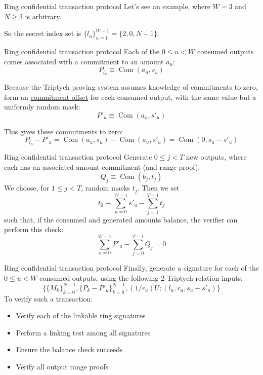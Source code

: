 \documentclass[aspectratio=169]{beamer}
\newcommand{\com}{\operatorname{Com}}
\begin{document}
\begin{frame}{Ring confidential transaction protocol}
Let's see an example, where $W = 3$ and $N \geq 3$ is arbitrary.

\begin{center}
\end{center}

So the secret index set is $\{l_u\}_{u=1}^{W-1} = \{2, 0, N-1\}$.
\end{frame}


\begin{frame}{Ring confidential transaction protocol}
Each of the $0 \leq u < W$ consumed outputs comes associated with a commitment to an amount $a_u$:
$$P_{l_u} \equiv \com(a_u,s_u)$$

Because the Triptych proving system assumes knowledge of commitments to zero, form an \underline{commitment offset} for each consumed output, with the same value but a uniformly random mask:
$$P'_u \equiv \com(a_u,s'_u)$$

This gives these commitments to zero:
$$P_{l_u} - P'_u = \com(a_u,s_u) - \com(a_u,s'_u) = \com(0,s_u-s'_u)$$
\end{frame}


\begin{frame}{Ring confidential transaction protocol}
Generate $0 \leq j < T$ new outputs, where each has an associated amount commitment (and range proof):
$$Q_j \equiv \com(b_j,t_j)$$
We choose, for $1 \leq j < T$, random masks $t_j$. Then we set
$$t_0 \equiv \sum_{u=0}^{W-1} s'_u - \sum_{j=1}^{T-1} t_j$$
such that, if the consumed and generated amounts balance, the verifier can perform this check:
$$\sum_{u=0}^{W-1} P'_u - \sum_{j=0}^{T-1} Q_j = 0$$
\end{frame}


\begin{frame}{Ring confidential transaction protocol}
Finally, generate a signature for each of the $0 \leq u < W$ consumed outputs, using the following 2-Triptych relation inputs:
$$\Big\{\{M_k\}_{k=0}^{N-1},\{P_k-P'_u\}_{k=0}^{N-1},(1/r_u)U; (l_u,r_u,s_u-s'_u)\Big\}$$
To verify such a transaction:
\begin{itemize}
\item Verify each of the linkable ring signatures
\item Perform a linking test among all signatures
\item Ensure the balance check succeeds
\item Verify all output range proofs
\end{itemize}
\end{frame}
\end{document}
